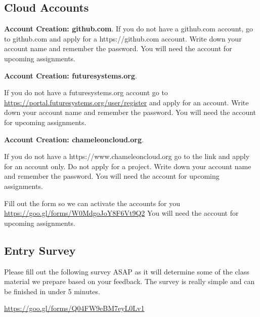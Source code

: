 \subsection{Cloud Accounts}

\begin{exercise}

  {\bf Account Creation: github.com}. If you do not have a github.com
  account, go to github.com and apply for a https://github.com
  account. Write down your account name and remember the password. You
  will need the account for upcoming assignments.

\end{exercise}

\begin{exercise}

  {\bf Account Creation: futuresystems.org}. 
  
  If you do not have a
  futuresystems.org account go to
  \url{https://portal.futuresystems.org/user/register} and apply for an
  account. Write down your account name and remember the password. You
  will need the account for upcoming assignments.

\end{exercise}

\begin{exercise}
  {\bf Account Creation: chameleoncloud.org}. 
  
  If you do not have a
  https://www.chameleoncloud.org go to the link and apply for an
  account only. Do not apply for a project. Write down your account
  name and remember the password. You will need the account for
  upcoming assignments.
\end{exercise}

\begin{exercise}
Fill out the form so we can activate the accounts for you
\url{https://goo.gl/forms/W0MdgoJoY8F6Vt9Q2}
You will need the account for
  upcoming assignments.
\end{exercise}

\subsection{Entry Survey}
\begin{exercise}
Please fill out the following survey ASAP as it will determine some of the class material we prepare based on your feedback. The survey is really simple and can be finished in under 5 minutes.

\url{https://goo.gl/forms/Q04FW9eBM7eyL0Lv1}
\end{exercise}

